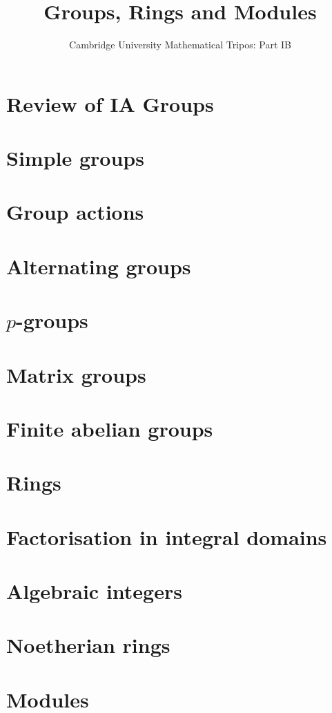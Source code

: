 \documentclass{article}
\title{Groups, Rings and Modules}
\author{Cambridge University Mathematical Tripos: Part IB}
\begin{document}
\maketitle

\tableofcontentsnewpage{}

\section{Review of IA Groups}

\section{Simple groups}

\section{Group actions}

\section{Alternating groups}

\section{\( p \)-groups}

\section{Matrix groups}

\section{Finite abelian groups}

\section{Rings}

\section{Factorisation in integral domains}

\section{Algebraic integers}

\section{Noetherian rings}

\section{Modules}

\end{document}
